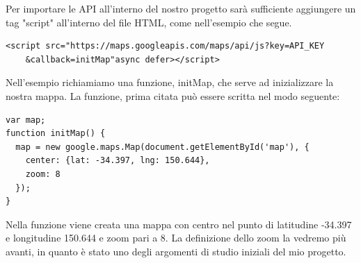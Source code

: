 Per importare le API all'interno del nostro progetto sarà sufficiente aggiungere un tag "script" all'interno del file HTML, come nell'esempio che segue.
\begin{lstlisting}
<script src="https://maps.googleapis.com/maps/api/js?key=API_KEY
	&callback=initMap"async defer></script>
\end{lstlisting}
Nell'esempio richiamiamo una funzione, initMap, che serve ad inizializzare la nostra mappa. La funzione, prima citata può essere scritta nel modo seguente:
\begin{lstlisting}
var map;
function initMap() {
  map = new google.maps.Map(document.getElementById('map'), {
    center: {lat: -34.397, lng: 150.644},
    zoom: 8
  });
}
\end{lstlisting}
Nella funzione viene creata una mappa con centro nel punto di latitudine -34.397 e longitudine 150.644 e zoom pari a 8. La definizione dello zoom la vedremo più avanti, in quanto è stato uno degli argomenti di studio iniziali del mio progetto.


